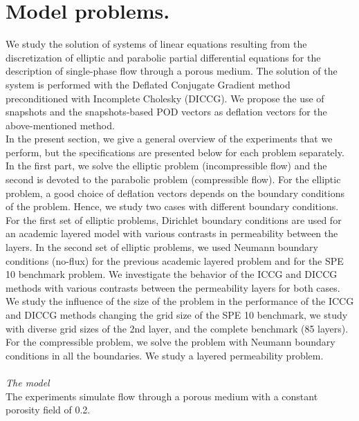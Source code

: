 \documentclass[12pt]{article}
\numberwithin{equation}{section}
\begin{document}
\section{Model problems.}\label{modpro}
\hspace{0.5cm} We study the solution of systems of linear equations resulting from the discretization of elliptic and parabolic partial differential equations for the description of single-phase flow through a porous medium. 
The solution of the system is performed with the Deflated Conjugate Gradient method preconditioned with Incomplete Cholesky (DICCG).
We propose the use of snapshots and the snapshots-based POD vectors as deflation vectors for the above-mentioned method.\\
In the present section, we give a general overview of the experiments that we perform, but the specifications
 are presented below for each problem separately. In the first part, we solve the elliptic problem (incompressible flow) and the second is devoted to the parabolic problem (compressible flow).
 For the elliptic problem, a good choice of deflation vectors depends on the boundary 
conditions of the problem. Hence, we study two cases with different boundary conditions. 
For the first set of elliptic problems, Dirichlet boundary conditions are used for 
an academic layered model with various contrasts in permeability between the layers. 
In the second set of elliptic problems, we used Neumann boundary conditions (no-flux) for the previous academic
layered problem and for the SPE 10 benchmark problem. 
We investigate the behavior of the ICCG and DICCG methods with various contrasts between the 
permeability layers for both cases. \\
We study the influence of the size of the problem in the performance of the ICCG and DICCG methods 
changing the grid size of the SPE 10 benchmark, we study with diverse grid sizes of the 2nd layer, and the complete benchmark (85 layers). \\
For the compressible problem, we solve the problem with Neumann boundary conditions in all the boundaries. We study a layered permeability problem.
\\ \\
\emph{The model}\\
The experiments simulate flow through a porous medium with a constant porosity field of 0.2.
\end{document}
